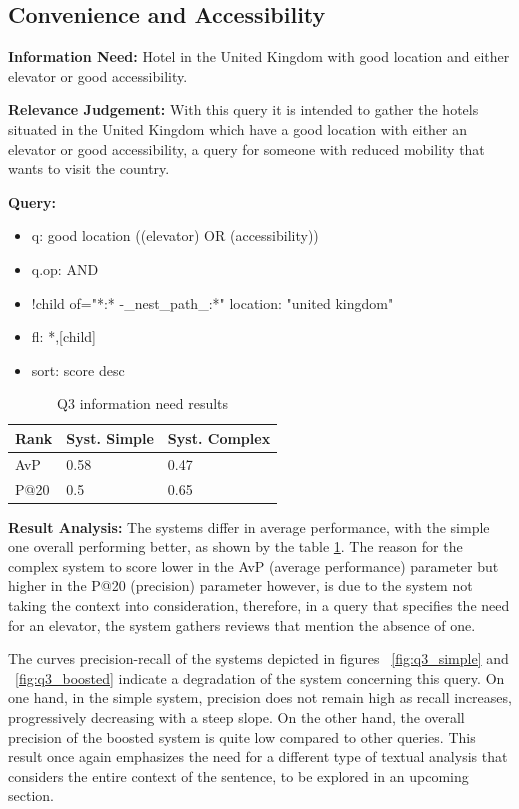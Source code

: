 \documentclass[sigconf]{acmart}
\begin{document}
\subsection{Convenience and Accessibility}

\textbf{Information Need:} Hotel in the United Kingdom with good location and either elevator or good accessibility.

\textbf{Relevance Judgement:} With this query it is intended to gather the hotels situated in the United Kingdom which have a good location with either an elevator or good accessibility, a query for someone with reduced mobility that wants to visit the country.

\textbf{Query:}

\begin{itemize}
    \item q: good location ((elevator) OR (accessibility))
    \item q.op: AND
    \item {!child of="*:* -\_nest\_path\_:*"} location: "united kingdom"
    \item fl: *,[child]
    \item sort: score desc
\end{itemize}

\begin{table}[h]
\caption{Q3 information need results}
\label{tab:q3}
\begin{tabular}{lll}
\toprule
Rank & Syst. Simple & Syst. Complex\\
\midrule
AvP & 0.58 & 0.47  \\
P@20 & 0.5 & 0.65 \\
\bottomrule
\end{tabular}
\end{table}

\textbf{Result Analysis:} The systems differ in average performance, with the simple one overall performing better, as shown by the table \ref{tab:q3}. The reason for the complex system to score lower in the AvP (average performance) parameter but higher in the P@20 (precision) parameter however, is due to the system not taking the context into consideration, therefore, in a query that specifies the need for an elevator, the system gathers reviews that mention the absence of one.

The curves precision-recall of the systems depicted in figures ~\ref{fig:q3_simple} and ~\ref{fig:q3_boosted} indicate a degradation of the system concerning this query. On one hand, in the simple system, precision does not remain high as recall increases, progressively decreasing with a steep slope. On the other hand, the overall precision of the boosted system is quite low compared to other queries. This result once again emphasizes the need for a different type of textual analysis that considers the entire context of the sentence, to be explored in an upcoming section.
\end{document}
